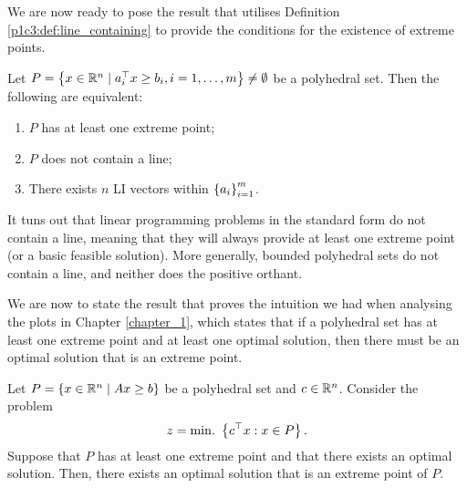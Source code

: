 We are now ready to pose the result that utilises Definition \ref{p1c3:def:line_containing} to provide the conditions for the existence of extreme points.

\begin{theorem}\label{p1c3:thm:exist_extreme_point}
	Let $P = \left\{ x \in \mathbb{R}^n \mid a_i^\top x \geq b_i, i = 1, \dots, m \right \} \neq \emptyset$ be a polyhedral set. Then the following are equivalent:
	\begin{enumerate}
		\item $P$ has at least one extreme point;
		\item $P$ does not contain a line;
		\item There exists $n$ LI vectors within $\left\{ a_i \right \}_{i=1}^m$.	
	\end{enumerate}	
\end{theorem}	 


It tuns out that linear programming problems in the standard form do not contain a line, meaning that they will always provide at least one extreme point (or a basic feasible solution). More generally, bounded polyhedral sets do not contain a line, and neither does the positive orthant.

We are now to state the result that proves the intuition we had when analysing the plots in Chapter \ref{chapter_1}, which states that if a polyhedral set has at least one extreme point and at least one optimal solution, then there must be an optimal solution that is an extreme point.

\begin{theorem}\label{p1c3:thm:opt_extreme}
		Let $P = \left\{ x \in \mathbb{R}^n \mid Ax \geq b \right \}$ be a polyhedral set and $c \in \mathbb{R}^n$. Consider the problem 
			\begin{equation*}
		    		z = \mathop{\text{min.~}}\left\{ c^\top x : x \in P \right \}.					
			\end{equation*}
		Suppose that $P$ has at least one extreme point and that there exists an optimal solution. Then, there exists an optimal solution that is an extreme point of $P$.
\end{theorem}

